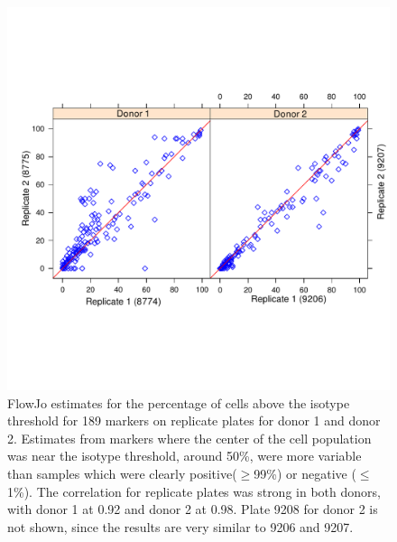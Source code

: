 \documentclass[12pt]{article}
\begin{document}
\begin{figure}
\centering
\includegraphics{replicate.pdf}
\caption{FlowJo estimates for the percentage of cells above the isotype
threshold for 189 markers on replicate plates for donor 1 and donor 2.
Estimates from markers where the center of the cell population was near the
isotype threshold, around 50\%, were more variable than samples which were
clearly positive($\ge$99\%) or negative ($\le$1\%). The correlation for
replicate plates was strong in both donors, with donor 1 at 0.92 and donor 2 at
0.98. Plate 9208 for donor 2 is not shown, since the results are very similar to
9206 and 9207.}
\label{fig:replicate}
\end{figure}
\end{document}

